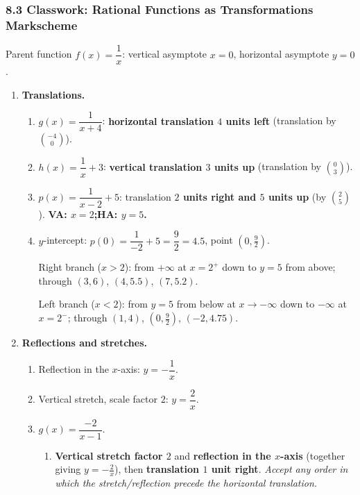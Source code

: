 \documentclass[12pt, twoside]{article}
\begin{document}
\subsubsection*{8.3 Classwork: Rational Functions as Transformations \,\textemdash\, Markscheme}

Parent function $f(x)=\dfrac{1}{x}$: vertical asymptote $x=0$, horizontal asymptote $y=0$.

\begin{enumerate}[itemsep=0.3cm]

\item \textbf{Translations.}

\begin{enumerate}[label=(\alph*), itemsep=0.2cm]
  \item $g(x)=\dfrac{1}{x+4}$: \textbf{horizontal translation $4$ units left}
  (translation by $\binom{-4}{0}$).

  \item $h(x)=\dfrac{1}{x}+3$: \textbf{vertical translation $3$ units up}
  (translation by $\binom{0}{3}$).

  \item $p(x)=\dfrac{1}{x-2}+5$: translation \textbf{$2$ units right and $5$ units up}
  (by $\binom{2}{5}$). \textbf{VA: $x=2$;\quad HA: $y=5$.}

  \item $y$-intercept: $p(0)=\dfrac{1}{-2}+5=\dfrac{9}{2}=4.5$, point $\left(0,\tfrac92\right)$.

  Right branch ($x>2$): from $+\infty$ at $x=2^+$ down to $y=5$ from above; through
  $(3,6)$, $(4,5.5)$, $(7,5.2)$.

  Left branch ($x<2$): from $y=5$ from below at $x\to-\infty$ down to $-\infty$ at
  $x=2^-$; through $(1,4)$, $\left(0,\tfrac92\right)$, $(-2,4.75)$.
\end{enumerate}

\medskip

\item \textbf{Reflections and stretches.}

\begin{enumerate}[label=(\alph*), itemsep=0.2cm]
  \item Reflection in the $x$-axis: $y=-\dfrac{1}{x}$.

  \item Vertical stretch, scale factor $2$: $y=\dfrac{2}{x}$.

  \item $g(x)=\dfrac{-2}{x-1}$.
  \begin{enumerate}[label=(\roman*), itemsep=0.15cm]
    \item \textbf{Vertical stretch factor $2$} and \textbf{reflection in the $x$-axis}
    (together giving $y=-\tfrac{2}{x}$), then \textbf{translation $1$ unit right}.
    \emph{Accept any order in which the stretch/reflection precede the horizontal
    translation.}


\end{enumerate}
\end{enumerate}
\end{enumerate}
\end{document}
